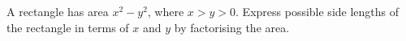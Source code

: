 A rectangle has area $x^2-y^2$, where $x>y>0$. Express possible side lengths of the rectangle in terms of $x$ and $y$ by factorising the area.
